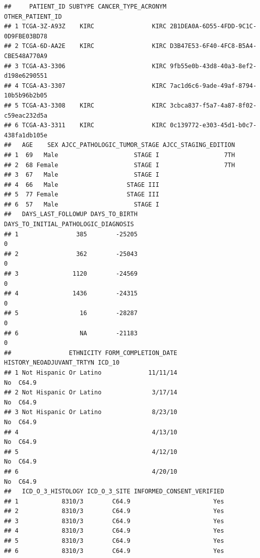 \documentclass[
]{article}
\begin{document}
\begin{verbatim}
##     PATIENT_ID SUBTYPE CANCER_TYPE_ACRONYM                     OTHER_PATIENT_ID
## 1 TCGA-3Z-A93Z    KIRC                KIRC 2B1DEA0A-6D55-4FDD-9C1C-0D9FBE03BD78
## 2 TCGA-6D-AA2E    KIRC                KIRC D3B47E53-6F40-4FC8-B5A4-CBE548A770A9
## 3 TCGA-A3-3306                        KIRC 9fb55e0b-43d8-40a3-8ef2-d198e6290551
## 4 TCGA-A3-3307                        KIRC 7ac1d6c6-9ade-49af-8794-10b5b96b2b05
## 5 TCGA-A3-3308    KIRC                KIRC 3cbca837-f5a7-4a87-8f02-c59eac232d5a
## 6 TCGA-A3-3311    KIRC                KIRC 0c139772-e303-45d1-b0c7-438fa1db105e
##   AGE    SEX AJCC_PATHOLOGIC_TUMOR_STAGE AJCC_STAGING_EDITION
## 1  69   Male                     STAGE I                  7TH
## 2  68 Female                     STAGE I                  7TH
## 3  67   Male                     STAGE I                     
## 4  66   Male                   STAGE III                     
## 5  77 Female                   STAGE III                     
## 6  57   Male                     STAGE I                     
##   DAYS_LAST_FOLLOWUP DAYS_TO_BIRTH DAYS_TO_INITIAL_PATHOLOGIC_DIAGNOSIS
## 1                385        -25205                                    0
## 2                362        -25043                                    0
## 3               1120        -24569                                    0
## 4               1436        -24315                                    0
## 5                 16        -28287                                    0
## 6                 NA        -21183                                    0
##                ETHNICITY FORM_COMPLETION_DATE HISTORY_NEOADJUVANT_TRTYN ICD_10
## 1 Not Hispanic Or Latino             11/11/14                        No  C64.9
## 2 Not Hispanic Or Latino              3/17/14                        No  C64.9
## 3 Not Hispanic Or Latino              8/23/10                        No  C64.9
## 4                                     4/13/10                        No  C64.9
## 5                                     4/12/10                        No  C64.9
## 6                                     4/20/10                        No  C64.9
##   ICD_O_3_HISTOLOGY ICD_O_3_SITE INFORMED_CONSENT_VERIFIED
## 1            8310/3        C64.9                       Yes
## 2            8310/3        C64.9                       Yes
## 3            8310/3        C64.9                       Yes
## 4            8310/3        C64.9                       Yes
## 5            8310/3        C64.9                       Yes
## 6            8310/3        C64.9                       Yes

\end{verbatim}
\end{document}
